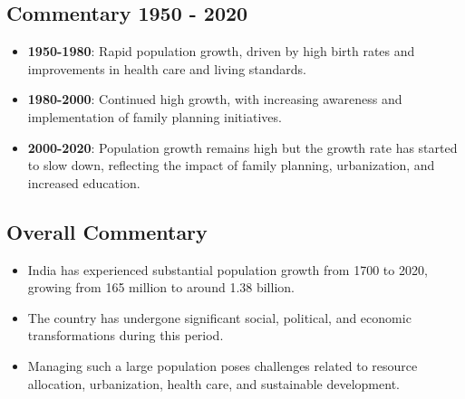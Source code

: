 \subsection*{Commentary 1950 - 2020}
\begin{itemize}
    \item \textbf{1950-1980}: Rapid population growth, driven by high birth rates and improvements in health care and living standards.
    \item \textbf{1980-2000}: Continued high growth, with increasing awareness and implementation of family planning initiatives.
    \item \textbf{2000-2020}: Population growth remains high but the growth rate has started to slow down, reflecting the impact of family planning, urbanization, and increased education.
\end{itemize}

\subsection*{Overall Commentary}
\begin{itemize}
    \item India has experienced substantial population growth from 1700 to 2020, growing from 165 million to around 1.38 billion.
    \item The country has undergone significant social, political, and economic transformations during this period.
    \item Managing such a large population poses challenges related to resource allocation, urbanization, health care, and sustainable development.
\end{itemize}